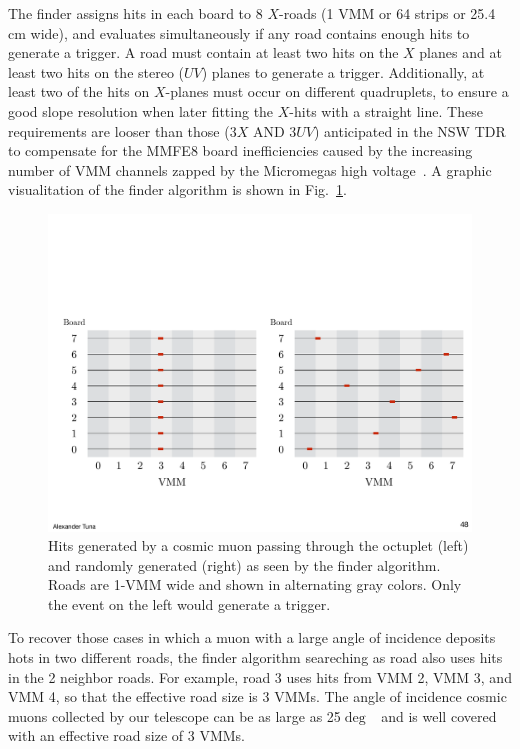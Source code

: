 The finder assigns hits in each board to 8 $X$-roads (1 VMM or 64 strips or 25.4 cm wide), and evaluates
simultaneously if any road contains enough hits to generate a trigger.
A road must contain at least two hits on the $X$ planes and at least two hits on the stereo ($UV$) planes to generate a trigger.
 Additionally, at least two of the hits on $X$-planes must occur on different quadruplets, to ensure a good slope resolution when
 later  fitting the $X$-hits with a straight line.
 These requirements are looser than those ($3X$ AND $3UV$)  anticipated in the
  NSW TDR to compensate for the MMFE8 board inefficiencies caused by the increasing number  of VMM channels zapped by the
 Micromegas  high voltage~\cite{noiseless}.
 A graphic visualitation of the finder algorithm is shown in Fig.~\ref{fig:cartoon_road_demo}.

\begin{figure}[!htpb]
  \begin{center}
    \includegraphics[width=1.0\textwidth]{figures/cartoons/cartoon_road_demo}
  \end{center}
  \vspace{-20pt}
  \caption{Hits generated by a cosmic muon passing through the octuplet (left) and
  randomly generated (right) as seen by the finder algorithm. Roads are 1-VMM wide and shown in alternating gray colors.
 Only the event on the left would generate a trigger.}
  \label{fig:cartoon_road_demo}
\end{figure}

To recover those  cases in which a muon with a large angle of incidence deposits hots in two different roads, 
 the finder algorithm seareching as road also uses hits  in the 2 neighbor roads. 
 For example, road 3 uses hits from VMM 2, VMM 3, and VMM 4, so that the effective road size is 3 VMMs.
 The  angle of incidence cosmic muons collected by our telescope can be as large as 25$\deg$~\cite{noiseless}
 and is well covered with  an effective road size of 3 VMMs.

